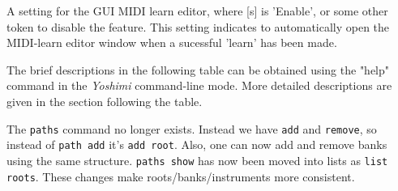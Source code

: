    A setting for the GUI MIDI learn editor, where [s] is 'Enable', or some
   other token to disable the feature.
   This setting indicates to automatically open the MIDI-learn editor window
   when a sucessful 'learn' has been made.



\iffalse
   The brief descriptions in the following table can be obtained using the
   "help" command in the \textsl{Yoshimi} command-line mode.  More detailed
   descriptions are given in the section following the table.

   The \texttt{paths} command no longer exists. Instead we have \texttt{add}
   and \texttt{remove}, so instead of \texttt{path add} it's \texttt{add root}.
   Also, one can now add and remove banks using the same structure.
   \texttt{paths show} has now been moved into lists as \texttt{list roots}.
   These changes make roots/banks/instruments more consistent.

